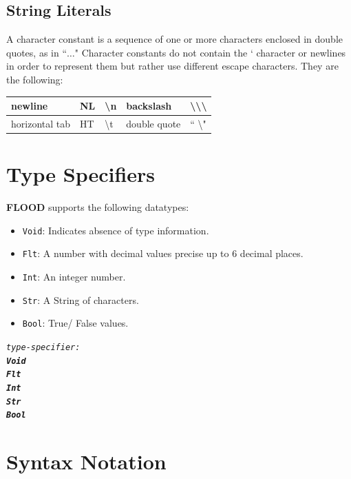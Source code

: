 \documentclass[12pt]{report}
\begin{document}
\subsection{String Literals}

A character constant is a sequence of one or more characters enclosed in double quotes, as in ``$\ldots$" Character constants do not contain the ` character or newlines in order to represent them but rather use different escape characters. They are the following:

\begin{center}
\begin{tabular}{ | l | l | l | l | l | }
\hline
newline & NL & \textbackslash{n} & backslash & \textbackslash\hspace{1 mm}\textbackslash\textbackslash \\
\hline
horizontal tab & HT & \textbackslash{t} & double quote & `` \textbackslash" \\
\hline
\end{tabular}
\end{center}

\section{Type Specifiers}

\textbf{FLOOD} supports the following datatypes:
\begin{itemize}
\item \texttt{Void}: Indicates absence of type information.
\item \texttt{Flt}: A number with decimal values precise up to 6 decimal places.
\item \texttt{Int}: An integer number.
\item \texttt{Str}: A String of characters.
\item \texttt{Bool}: True/ False values.
\end{itemize}
\begin{alltt}\begin{singlespace}
         \textit{type-specifier:}
              \textit{\textbf{Void}}
              \textit{\textbf{Flt}}
              \textit{\textbf{Int}}
              \textit{\textbf{Str}}
              \textit{\textbf{Bool}}\end{singlespace}
\end{alltt}

\section{Syntax Notation}
\end{document}
